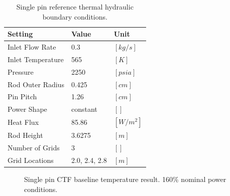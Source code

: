 \begin{table}[H]
    \begin{center}
        \caption{Single pin reference thermal hydraulic boundary conditions.}
        \begin{tabular}{|l|l|l|}
            \hline
            Setting & Value & Unit \\
            \hline
            Inlet Flow Rate & 0.3 & $[kg/s]$ \\
            Inlet Temperature & 565 & $[K]$ \\
            Pressure & 2250 & $[psia]$ \\
            Rod Outer Radius & 0.425 & $[cm]$ \\
            Pin Pitch & 1.26 & $[cm]$ \\
            Power Shape & constant & $[]$ \\
            Heat Flux & 85.86  & $[W/m^2]$ \\
            Rod Height & 3.6275 & $[m]$ \\
            Number of Grids & 3  & $[]$ \\
            Grid Locations & 2.0, 2.4, 2.8 & $[m]$ \\
            \hline
        \end{tabular}
    \label{tab:pin_settings}
    \end{center}
\end{table}

\begin{figure}[H]%
    \centering
    \hspace*{-1.0em}%
    \caption[Single pin CTF baseline temperature result.  160\% nominal power conditions.]{Single pin CTF baseline temperature result.  160\% nominal power conditions.}%
    \label{fig:ctf_twall_orig}%
\end{figure}

